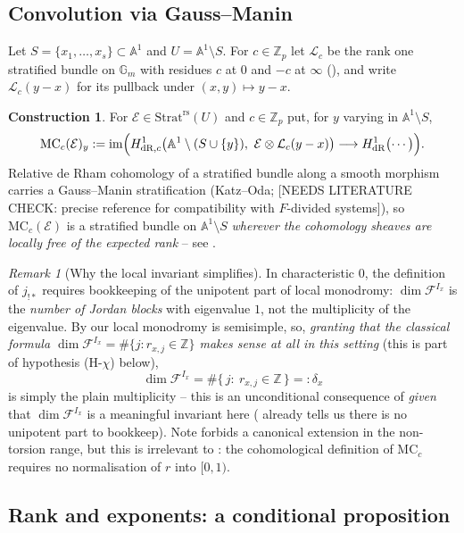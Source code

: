 \documentclass[11pt,reqno]{amsart}
\newcommand{\NEEDSLITERATURECHECK}[1]{{\color{green!40!black}\textsf{[NEEDS
LITERATURE CHECK: #1]}}}
\newcommand{\Zp}{\mathbb{Z}_p}
\newcommand{\ZZ}{\mathbb{Z}}
\newcommand{\GG}{\mathbb{G}}
\newcommand{\AAA}{\mathbb{A}}
\newcommand{\cE}{\mathcal{E}}
\newcommand{\cF}{\mathcal{F}}
\newcommand{\cL}{\mathcal{L}}
\newcommand{\Strat}{\mathrm{Strat}}
\newcommand{\rs}{\mathrm{rs}}
\newcommand{\im}{\mathrm{im}}
\newcommand{\MC}{\mathrm{MC}}
\newcommand{\dR}{\mathrm{dR}}
\theoremstyle{plain}
\theoremstyle{definition}
\newtheorem{construction}[theorem]{Construction}
\theoremstyle{remark}
\newtheorem{remark}[theorem]{Remark}
\numberwithin{equation}{section}
\begin{document}
\subsection{Convolution via Gauss--Manin}
Let $S=\{x_1,\dots,x_s\}\subset\AAA^1$ and $U=\AAA^1\setminus S$.  For
$c\in\Zp$ let $\cL_c$ be the rank one stratified bundle on $\GG_m$ with
residues $c$ at $0$ and $-c$ at $\infty$ (), and write
$\cL_c(y-x)$ for its pullback under $(x,y)\mapsto y-x$.

\begin{construction}\label{con:MC}
For $\cE\in\Strat^{\rs}(U)$ and $c\in\Zp$ put, for $y$ varying in
$\AAA^1\setminus S$,
\[
   \MC_c(\cE)_y:=\im\Bigl(
     H^1_{\dR,c}\bigl(\AAA^1\setminus(S\cup\{y\}),\ \cE\otimes\cL_c(y-x)\bigr)
     \longrightarrow
     H^1_{\dR}\bigl(\cdots\bigr)\Bigr).
\]
Relative de Rham cohomology of a stratified bundle along a smooth
morphism carries a Gauss--Manin stratification (Katz--Oda;
\NEEDSLITERATURECHECK{precise reference for compatibility with
$F$-divided systems}), so $\MC_c(\cE)$ is a stratified bundle on
$\AAA^1\setminus S$
\emph{wherever the cohomology sheaves are locally free of the expected
rank} -- see .
\end{construction}

\begin{remark}[Why the local invariant simplifies]\label{rem:middle}
In characteristic $0$, the definition of $j_{!*}$ requires bookkeeping of
the unipotent part of local monodromy: $\dim\cF^{I_x}$ is the
\emph{number of Jordan blocks} with eigenvalue $1$, not the multiplicity
of the eigenvalue.  By  our local monodromy is
semisimple, so, \emph{granting that the classical formula
$\dim\cF^{I_x}=\#\{j:r_{x,j}\in\ZZ\}$ makes sense at all in this
setting} (this is part of hypothesis (H-$\chi$) below),
\[
   \dim\cF^{I_x}=\#\{\,j:\ r_{x,j}\in\ZZ\,\}=:\delta_x
\]
is simply the plain multiplicity -- this is an unconditional consequence
of  \emph{given} that $\dim\cF^{I_x}$ is a
meaningful invariant here ( already tells us there
is no unipotent part to bookkeep).  Note  forbids a
canonical extension in the non-torsion range, but this is irrelevant to
: the cohomological definition of $\MC_c$ requires no
normalisation of $r$ into $[0,1)$.
\end{remark}

\subsection{Rank and exponents: a conditional proposition}
\end{document}
